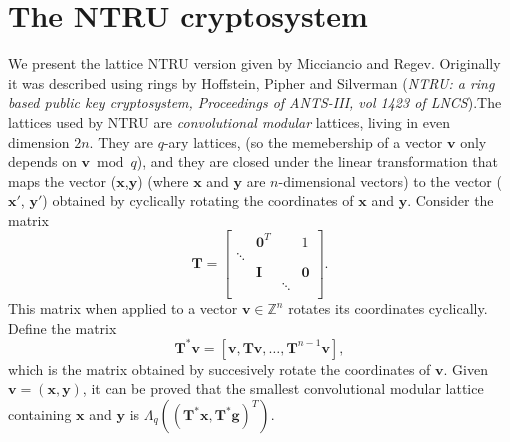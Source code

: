 \documentclass[11pt]{article}
\begin{document}
\section*{The NTRU cryptosystem}
We present the lattice NTRU version given by Micciancio and Regev. Originally it was described using rings by Hoffstein, Pipher and Silverman (\emph{NTRU: a ring based public key cryptosystem, Proceedings of ANTS-III, vol 1423 of LNCS}).The lattices used by NTRU are \emph{convolutional modular} lattices, living in even dimension $2n$. They are $q$-ary lattices, (so the memebership of a vector $\boldsymbol{v}$ only depends on $\boldsymbol{v} \bmod q$), and they are closed under the linear transformation that maps the vector ($\boldsymbol{x}$,$\boldsymbol{y}$) (where $\boldsymbol{x}$ and $\boldsymbol{y}$ are $n$-dimensional vectors) to the vector ($\boldsymbol{x'}$, $\boldsymbol{y'}$) obtained by cyclically rotating the coordinates of $\boldsymbol{x}$ and $\boldsymbol{y}$. Consider the matrix
\begin{equation*}
  \boldsymbol{T} = 
  \begin{bmatrix}
           & \boldsymbol{0}^T &   &  1 \\
           \hline
    \ddots &                  &   &    \\
           & \boldsymbol{I}   &   &  \boldsymbol{0}  \\
           &                  & \ddots & \\
 
  \end{bmatrix}.
\end{equation*}  
This matrix when applied to a vector $\boldsymbol{v} \in \mathbb{Z}^n$ rotates its coordinates cyclically. Define the matrix
\begin{equation*}
\boldsymbol{T}^* \boldsymbol{v} = [\boldsymbol{v}, \boldsymbol{T}\boldsymbol{v}, \ldots, \boldsymbol{T}^{n-1}\boldsymbol{v}],
\end{equation*}
which is the matrix obtained by succesively rotate the coordinates of $\boldsymbol{v}$. Given $\boldsymbol{v} = (\boldsymbol{x},\boldsymbol{y})$, it can be proved that the smallest convolutional modular lattice containing $\boldsymbol{x}$ and $\boldsymbol{y}$ is $\Lambda_q((\boldsymbol{T^*x}, \boldsymbol{T^*g})^T)$.
\end{document}
